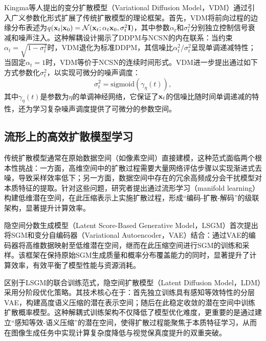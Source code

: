 \documentclass[11pt,a4paper,UTF8]{ctexart}
\begin{document}
Kingma等人提出的变分扩散模型（Variational Diffusion Model，VDM）\cite{kingma2021variational}通过引入广义参数化形式扩展了传统扩散模型的理论框架。首先，VDM将前向过程的边缘分布表述为$q(\mathbf{x}_t|\mathbf{x}_0)=\mathcal{N}(\mathbf{x}_t;\alpha_t\mathbf{x}_0,\sigma_t^2\mathbf{I})$，其中参数$\alpha_t$和$\sigma_t^2$分别独立控制信号衰减和噪声注入。这种解耦设计揭示了DDPM与NCSN的内在联系：当约束$\alpha_t=\sqrt{1-\sigma_t^2}$时，VDM退化为标准DDPM，其信噪比$\alpha_t^2/\sigma_t^2$呈现单调递减特性；当固定$\alpha_t=1$时，VDM等价于NCSN的连续时间形式。VDM进一步提出通过如下方式参数化$\sigma_t^2$，以实现可微分的噪声调度：
\begin{equation*}
    \sigma_t^2=\text{sigmoid}(\gamma_\eta(t)),
\end{equation*}
其中$\gamma_\eta(t)$是参数为$\eta$的单调神经网络，它保证了$\mathbf{x}_t$的信噪比随时间单调递减的特性，还为学习复杂噪声调度提供了可微分的参数空间。


\subsection{流形上的高效扩散模型学习}

传统扩散模型通常在原始数据空间（如像素空间）直接建模，这种范式面临两个根本性挑战：一方面，高维空间中的扩散过程需要大量网络评估步骤以实现渐进式去噪，导致采样效率低下；另一方面，数据空间中存在的冗余高频成分会干扰模型对本质特征的提取。针对这些问题，研究者提出通过流形学习（manifold learning）构建低维潜在空间，在此压缩表示上实施扩散过程，形成“编码-扩散-解码”的级联架构，显著提升计算效率。

隐空间分数生成模型（Latent Score-Based Generative Model，LSGM）\cite{vahdat2021score}首次提出将SGM和变分自编码器（Variational Autoencoder，VAE）结合：通过VAE的编码器将高维数据映射至低维潜在空间，继而在此压缩空间进行SGM的训练和采样。该框架在保持原始SGM生成质量和概率分布覆盖能力的同时，显著提升了计算效率，有效平衡了模型性能与资源消耗。

区别于LSGM的联合训练范式，隐空间扩散模型（Latent Diffusion Model，LDM）\cite{rombach2022high}采用分阶段优化策略。其技术核心在于：首先独立训练具有感知等效特性的分层VAE，构建高度语义压缩的潜在表示空间；随后在此稳定收敛的潜在空间中训练扩散概率模型。这种解耦式训练架构不仅降低了模型优化难度，更重要的是通过建立“感知等效-语义压缩”的潜在空间，使得扩散过程能聚焦于本质特征学习，从而在图像生成任务中实现计算复杂度降低与视觉保真度提升的双重突破。
\end{document}
